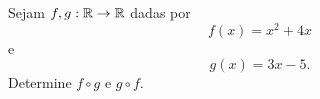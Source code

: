 Sejam $f,g:\mathbb{R}\rightarrow\mathbb{R}$ dadas por
\[
	f(x)=x^2+4x
\]
e
\[
	g(x)=3x-5.
\]
Determine $f\circ g$ e $g\circ f$.
